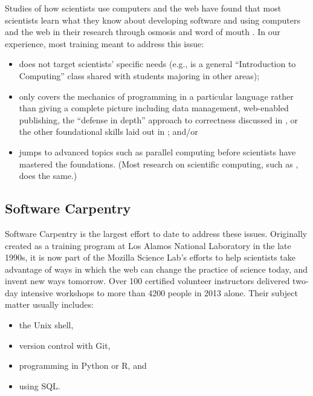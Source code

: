 \documentclass[11pt]{article}
\begin{document}
Studies of how scientists use computers and the web have found that
most scientists learn what they know about developing software and
using computers and the web in their research through osmosis and word
of mouth \cite{hannay2009,prabhu2011}. In our experience, most
training meant to address this issue:

\begin{itemize}

\item
  does not target scientists' specific needs (e.g., is a general
  ``Introduction to Computing'' class shared with students majoring in
  other areas);

\item
  only covers the mechanics of programming in a particular language
  rather than giving a complete picture including data management,
  web-enabled publishing, the ``defense in depth'' approach to
  correctness discussed in \cite{dubois2005}, or the other
  foundational skills laid out in \cite{wilson2013}; and/or

\item
  jumps to advanced topics such as parallel computing before
  scientists have mastered the foundations.  (Most research on
  scientific computing, such as \cite{hochstein2005}, does the same.)

\end{itemize}

\subsection{Software Carpentry}

Software Carpentry \cite{swcsite,wilson2012} is the largest effort to
date to address these issues. Originally created as a training program
at Los Alamos National Laboratory in the late 1990s, it is now part of
the Mozilla Science Lab's efforts to help scientists take advantage of
ways in which the web can change the practice of science today, and
invent new ways tomorrow.  Over 100 certified volunteer instructors
delivered two-day intensive workshops to more than 4200 people in 2013
alone.  Their subject matter usually includes:

\begin{itemize}
\item
  the Unix shell,
\item
  version control with Git,
\item
  programming in Python or R, and
\item
  using SQL.
\end{itemize}
\end{document}
